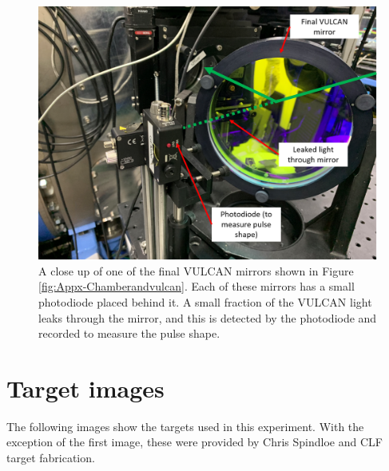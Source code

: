 \begin{figure}
\begin{centering}
\includegraphics[width=1.0\textwidth]{figures/AppendixExperiment/Photodiode.png}%
\caption{\label{fig:Appx-Photodiode} A close up of one of the final VULCAN mirrors shown in Figure \ref{fig:Appx-Chamberandvulcan}. Each  of these mirrors has a small photodiode placed behind it. A small fraction of the VULCAN light leaks through the mirror, and this is detected by the photodiode and recorded to measure the pulse shape.}
\end{centering}
\end{figure}

\section{Target images}

The following images show the targets used in this experiment. With the exception of the first image, these were provided by Chris Spindloe and CLF target fabrication.

